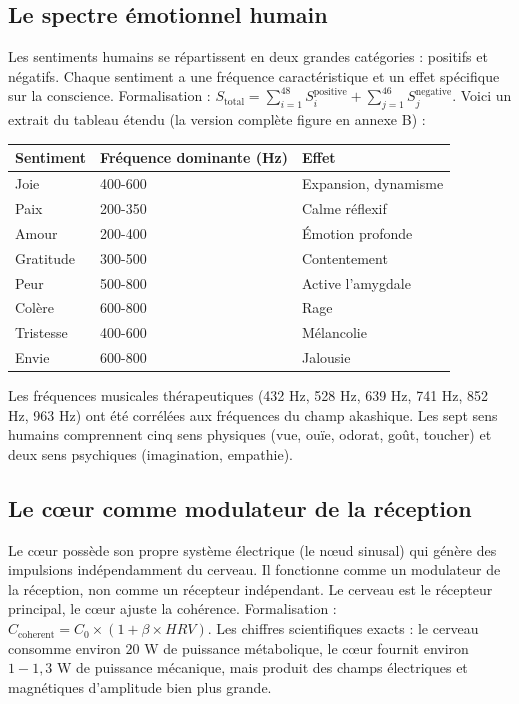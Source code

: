 \documentclass[11pt,a4paper]{article}
\begin{document}
\subsection{Le spectre émotionnel humain}
Les sentiments humains se répartissent en deux grandes catégories : positifs et négatifs. Chaque sentiment a une fréquence caractéristique et un effet spécifique sur la conscience. Formalisation : $S_{\text{total}} = \sum_{i=1}^{48} S_i^{\text{positive}} + \sum_{j=1}^{46} S_j^{\text{negative}}$. Voici un extrait du tableau étendu (la version complète figure en annexe B) :
\begin{table}[H]
\centering
\begin{tabular}{@{}lll@{}}
\toprule
\textbf{Sentiment} & \textbf{Fréquence dominante (Hz)} & \textbf{Effet} \\ \midrule
Joie & 400-600 & Expansion, dynamisme \\
Paix & 200-350 & Calme réflexif \\
Amour & 200-400 & Émotion profonde \\
Gratitude & 300-500 & Contentement \\
Peur & 500-800 & Active l'amygdale \\
Colère & 600-800 & Rage \\
Tristesse & 400-600 & Mélancolie \\
Envie & 600-800 & Jalousie \\ \bottomrule
\end{tabular}
\end{table}
Les fréquences musicales thérapeutiques (432 Hz, 528 Hz, 639 Hz, 741 Hz, 852 Hz, 963 Hz) ont été corrélées aux fréquences du champ akashique. Les sept sens humains comprennent cinq sens physiques (vue, ouïe, odorat, goût, toucher) et deux sens psychiques (imagination, empathie).

\subsection{Le cœur comme modulateur de la réception}
Le cœur possède son propre système électrique (le nœud sinusal) qui génère des impulsions indépendamment du cerveau. Il fonctionne comme un modulateur de la réception, non comme un récepteur indépendant. Le cerveau est le récepteur principal, le cœur ajuste la cohérence. Formalisation : $C_{\text{coherent}} = C_0 \times (1 + \beta \times HRV)$. Les chiffres scientifiques exacts : le cerveau consomme environ $20$ W de puissance métabolique, le cœur fournit environ $1-1,3$ W de puissance mécanique, mais produit des champs électriques et magnétiques d'amplitude bien plus grande.
\end{document}

